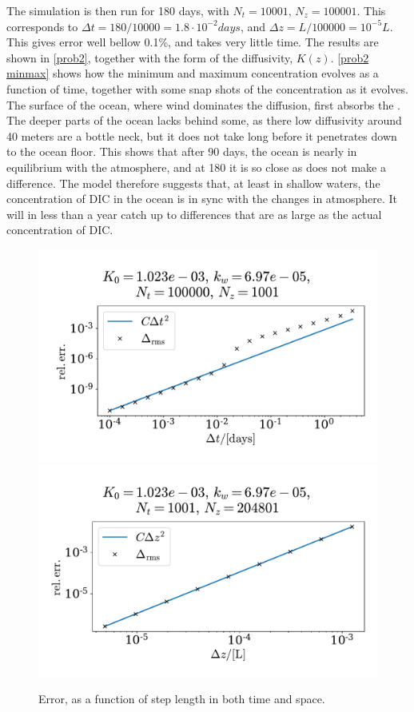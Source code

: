 \documentclass{article}
\begin{document}
    The simulation is then run for 180 days, with $N_t = 10001, \, N_z = 100001$.
    This corresponds to $\Delta t = 180 / 10000 = 1.8 \cdot 10^{-2} \si{days}$, and $\Delta z = L/100000 = 10^{-5} L$.
    This gives error well bellow 0.1\%, and takes very little time.
    The results are shown in \autoref{prob2}, together with the form of the diffusivity, $K(z)$.
    \autoref{prob2 minmax} shows how the minimum and maximum concentration evolves as a function of time, together with some snap shots of the concentration as it evolves.
    The surface of the ocean, where wind dominates the diffusion, first absorbs the .
    The deeper parts of the ocean lacks behind some, as there low diffusivity around 40 meters are a bottle neck, but it does not take long before it penetrates down to the ocean floor.
    This shows that after 90 days, the ocean is nearly in equilibrium with the atmosphere, and at 180 it is so close as does not make a difference.
    The model therefore suggests that, at least in shallow waters, the concentration of DIC in the ocean is in sync with the changes in atmosphere.
    It will in less than a year catch up to differences that are as large as the actual concentration of DIC.

    \begin{figure}[H]
        \centering
        \includegraphics[width=.49\textwidth]{../plots/prob2_conv_test_t}
        \includegraphics[width=.49\textwidth]{../plots/prob2_conv_test_z}
        \caption{Error, as a function of step length in both time and space.}
        \label{prob2 conv}
    \end{figure}
\end{document}
